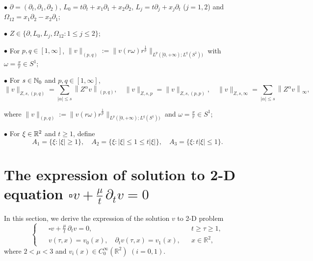 \documentclass[11pt,twoside]{article}
\newcommand{\R}{\mathbb R}
\newcommand{\p}{\partial}
\newcommand{\f}{\frac}
\renewcommand{\o}{\omega}
\theoremstyle{plain}
\theoremstyle{definition}
\theoremstyle{remark}
\numberwithin{equation}{section}
\begin{document}
$\bullet$  $\p=(\partial_t, \partial_1, \partial_2)$, $L_0=t \partial_t+x_1 \partial_1+x_2 \partial_2$,
$L_j=t\partial_j+x_j \partial_t$ ($j=1,2$) and $\Omega_{12}=x_1 \partial_2-x_2 \partial_1$;

$\bullet$  $Z\in\{\p, L_0, L_j, \Omega_{12}:  1\le j\le 2\}$;

$\bullet$ For $p,q\in[1,\infty]$, $\|v\|_{(p,q)} :=\|v(r \omega) r^{\frac{1}{p}}\|_{L^p([0,+\infty); L^q(S^1))}$
with $\o=\f{x}{r}\in S^1$;

$\bullet$ For $s\in\Bbb N_0$ and  $p,q\in[1,\infty]$,
\begin{equation*}\label{norm-1}
\|v\|_{Z, s,(p, q)}=\sum_{|\alpha| \leq s}\left\|Z^\alpha v\right\|_{(p, q)}, \quad
\|v\|_{Z, s, p}=\|v\|_{Z, s,(p, p)}, \quad
\|v\|_{Z, s, \infty}=\sum_{|\alpha| \leq s}\left\|Z^\alpha v\right\|_{\infty},
\end{equation*}

\quad where $\|v\|_{(p,q)} :=\|v(r \omega) r^{\frac{1}{p}}\|_{L^p([0,+\infty); L^q(S^1))}$
and $\o=\f{x}{r}\in S^1$;

$\bullet$ For $\xi\in\Bbb R^2$ and $t\ge 1$, define
\begin{equation*}\label{equ:q19}
A_1=\{\xi: |\xi|\ge 1\}, \quad A_2=\{\xi: |\xi| \leq 1 \leq t|\xi|\}, \quad A_3=\{\xi: t|\xi| \leq 1\}.
\end{equation*}





\section{The expression of solution to 2-D equation $\square v+\f{\mu}{t}\,\p_tv=0$}\label{sec2-1}

In this section, we derive the expression of the solution $v$ to 2-D problem
\begin{equation}\label{equ:q1}
\left\{ \enspace
\begin{aligned}
&\square v+\f{\mu}{t}\,\p_tv=0, &&
t\geq \tau \geq1,\\
&v(\tau,x)=v_0(x), \quad \partial_{t} v(\tau,x)=v_1(x), &&x\in\R^2,
\end{aligned}
\right.
\end{equation}
where $2<\mu<3$ and $v_i(x)\in C_0^{\infty}(\R^2)$ $(i=0, 1)$.
\end{document}
